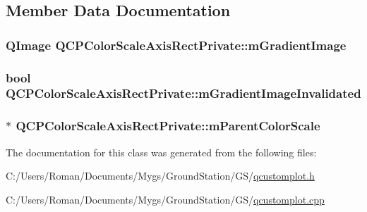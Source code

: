 \subsection{Member Data Documentation}
\hypertarget{class_q_c_p_color_scale_axis_rect_private_ad4f7c8ee1c6012d9950870811773119c}{}
\subsubsection[{m\+Gradient\+Image}]{\setlength{\rightskip}{0pt plus 5cm}Q\+Image Q\+C\+P\+Color\+Scale\+Axis\+Rect\+Private\+::m\+Gradient\+Image\hspace{0.3cm}{\ttfamily [protected]}}\label{class_q_c_p_color_scale_axis_rect_private_ad4f7c8ee1c6012d9950870811773119c}
\hypertarget{class_q_c_p_color_scale_axis_rect_private_a2c0b15b071e1f93006b48b5be022a631}{}
\subsubsection[{m\+Gradient\+Image\+Invalidated}]{\setlength{\rightskip}{0pt plus 5cm}bool Q\+C\+P\+Color\+Scale\+Axis\+Rect\+Private\+::m\+Gradient\+Image\+Invalidated\hspace{0.3cm}{\ttfamily [protected]}}\label{class_q_c_p_color_scale_axis_rect_private_a2c0b15b071e1f93006b48b5be022a631}
\hypertarget{class_q_c_p_color_scale_axis_rect_private_a311c73f51a4cb0b556388197833cf099}{}
\subsubsection[{m\+Parent\+Color\+Scale}]{$\ast$ Q\+C\+P\+Color\+Scale\+Axis\+Rect\+Private\+::m\+Parent\+Color\+Scale\hspace{0.3cm}{\ttfamily [protected]}}\label{class_q_c_p_color_scale_axis_rect_private_a311c73f51a4cb0b556388197833cf099}


The documentation for this class was generated from the following files\+:\begin{DoxyCompactItemize}
\item 
C\+:/\+Users/\+Roman/\+Documents/\+Mygs/\+Ground\+Station/\+G\+S/\hyperlink{qcustomplot_8h}{qcustomplot.\+h}\item 
C\+:/\+Users/\+Roman/\+Documents/\+Mygs/\+Ground\+Station/\+G\+S/\hyperlink{qcustomplot_8cpp}{qcustomplot.\+cpp}\end{DoxyCompactItemize}

